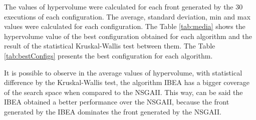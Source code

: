 \documentclass[conference]{IEEEtran}
\begin{document}
The values of hypervolume were calculated for each front generated by the 30 executions of each configuration. The average, standard deviation, min and max values were calculated for each configuration. The Table \ref{tab:media} shows the hypervolume value of the best configuration obtained for each algorithm and the result of the statistical Kruskal-Wallis test \cite{kruskal1952use} between them. The Table \ref{tab:bestConfigs} presents the best configuration for each algorithm.


\begin{table}[h]
	\centering
	\caption{Best results obtained}
	\label{tab:media}
\end{table}


It is possible to observe in the average values of hypervolume, with statistical difference by the Kruskal-Wallis test, the algorithm IBEA has a bigger coverage of the search space when compared to the NSGAII. This way, can be said the IBEA obtained a better performance over the NSGAII, because the front generated by the IBEA dominates the front generated by the NSGAII.


\begin{table}[h]
	\centering
	\caption{Best parameter configurations for the Algorithms}
	\label{tab:bestConfigs}
\end{table}
\end{document}
